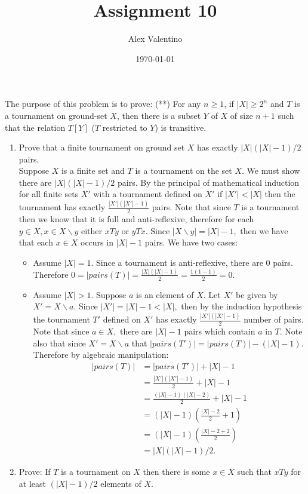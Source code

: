 \documentclass[12pt, letterpaper]{article}
\date{\today}
\author{Alex Valentino}
\title{Assignment 10}
\begin{document}
The purpose of this problem is to prove: (**) For any $n \geq 1$, if $|X| \geq 2^n$ and $T$ is a tournament on ground-set $X$, then there is a subset $Y$ of $X$ of size $n+1$ such that the relation $T[Y]$ ($T$ restricted to $Y$) is transitive. 
\begin{enumerate}
\item Prove that a finite tournament on ground set $X$ has exactly $|X|(|X|-1)/2$ pairs.\\

Suppose $X$ is a finite set and $T$ is a tournament on the set $X$.  We must show there are $|X|(|X|-1)/2$ pairs.  By the principal of mathematical induction for all finite sets $X'$ with a tournament defined on $X'$ if $|X'| < |X|$ then the tournament has exactly $\frac{|X'|(|X'|-1)}{2}$ pairs. %
Note that since $T$ is a tournament then we know that it is full and anti-reflexive, therefore for each $y\in X, x\in            
 X \backslash y$ either $xTy$ or $yTx$.  Since $|X \backslash y| = |X| - 1,$ then we have that each $x\in X$ occurs in $|X| - 1$ pairs.   We have two cases:
\begin{itemize}
	\item Assume $|X| = 1.$  Since a tournament is anti-reflexive, there are 0 pairs.  Therefore $0=|pairs(T)| = \frac{|X|(|X|-1)}{2} = \frac{1(1-1)}{2} = 0.$
	\item Assume $|X| > 1.$ Suppose $a$ is an element of $X$.  Let $X'$ be given by $X' = X \backslash a.$  Since $|X'| = |X| - 1 < |X|,$ then by the induction hypothesis the tournament $T'$ defined on $X'$ has exactly $\frac{|X'|(|X'|-1)}{2}$ number of pairs.  Note that since $a \in X,$ there are $|X|-1$ pairs which contain $a$ in $T$.  Note also that since $X' = X \backslash a$ that $|pairs(T')| = |pairs(T)| -(|X|-1)$.  Therefore by algebraic manipulation:
	\begin{align*}
		 |pairs(T)| &= |pairs(T')| + |X|-1 \\
		 &= \frac{|X'|(|X'|-1)}{2} + |X|-1 \\
		 &= \frac{(|X|-1)(|X|-2)}{2}+ |X|-1 \\
		 &= (|X|-1)(\frac{|X|-2}{2} + 1) \\
		 &= (|X|-1)(\frac{|X|-2+2}{2}) \\
		 &= |X|(|X|-1)/2.
	\end{align*}
\end{itemize}
\item Prove: If $T$ is a tournament on $X$ then  there is some $x \in X$ such that $x T y$ for at least $(|X|-1)/2$ elements of $X$.\\


\end{enumerate}
\end{document}

